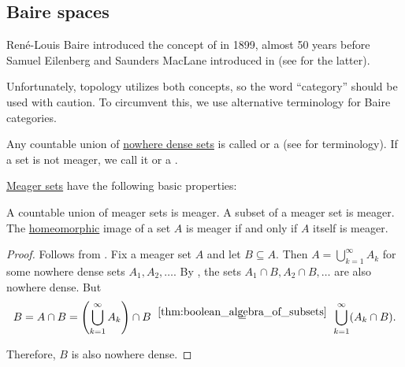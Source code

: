 \subsection{Baire spaces}\label{subsec:baire_spaces}

\begin{remark}\label{rem:baire_categories}
  René-Louis Baire introduced the concept of  in 1899, almost 50 years before Samuel Eilenberg and Saunders MacLane introduced  in \cite{EilenbergMacLane1945Equivalences} (see  for the latter).

  Unfortunately, topology utilizes both concepts, so the word \enquote{category} should be used with caution. To circumvent this, we use alternative terminology for Baire categories.
\end{remark}

\begin{definition}\label{def:meager_set}
  Any countable union of \hyperref[def:topologically_dense_set]{nowhere dense sets} is called  or a  (see  for terminology). If a set is not meager, we call it  or a .
\end{definition}

\begin{proposition}\label{thm:def:meager_set}
  \hyperref[def:meager_set]{Meager sets} have the following basic properties:
  \begin{thmenum}
     A countable union of meager sets is meager.
     A subset of a meager set is meager.
     The \hyperref[def:homeomorphism]{homeomorphic} image of a set \( A \) is meager if and only if \( A \) itself is meager.
  \end{thmenum}
\end{proposition}
\begin{proof}
   Follows from .
   Fix a meager set \( A \) and let \( B \subseteq A \). Then \( A = \bigcup_{k=1}^\infty A_k \) for some nowhere dense sets \( A_1, A_2, \ldots \). By , the sets \( A_1 \cap B, A_2 \cap B, \ldots \) are also nowhere dense. But
  \begin{equation*}
    B
    =
    A \cap B
    =
    \left(\bigcup_{k=1}^\infty A_k \right) \cap B
    \reloset {\ref{thm:boolean_algebra_of_subsets}} =
    \bigcup_{k=1}^\infty (A_k \cap B).
  \end{equation*}

  Therefore, \( B \) is also nowhere dense.

\end{proof}

